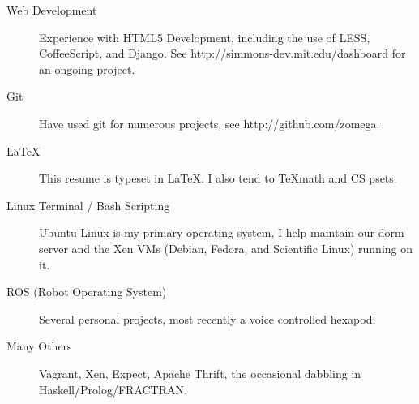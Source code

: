 \documentclass{res}
\begin{document}
\begin{resume}
\begin{description}
				\item[Web Development] Experience with HTML5 Development, including the use of LESS, CoffeeScript, and Django. See http://simmons-dev.mit.edu/dashboard for an ongoing project.

				\item[Git] Have used git for numerous projects, see http://github.com/zomega.

				\item[\LaTeX] This resume is typeset in \LaTeX. I also tend to \TeX \space math and CS psets.

				\item[Linux Terminal / Bash Scripting] Ubuntu Linux is my primary operating system, I help maintain our dorm server and the Xen VMs (Debian, Fedora, and Scientific Linux) running on it.

				\item[ROS (Robot Operating System)] Several personal projects, most recently a voice controlled hexapod.
				
				\item[Many Others] Vagrant, Xen, Expect, Apache Thrift, the occasional dabbling in Haskell/Prolog/FRACTRAN. 

			\end{description}
	\end{resume}
\end{document}
